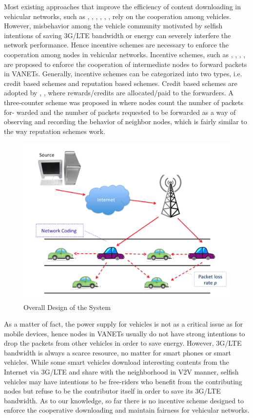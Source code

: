 \documentclass{acm_proc_article-sp}
\begin{document}
Most existing approaches that improve the efficiency of content downloading in vehicular networks, such as \cite{urban}, \cite{symbol}, \cite{cost}, \cite{opti}, \cite{ondemand}, \cite{datadissem}, rely on the cooperation among vehicles. However, misbehavior among the vehicle community motivated by selfish intentions of saving 3G/LTE bandwidth or energy can severely interfere the network performance. Hence incentive schemes are necessary to enforce the cooperation among nodes in vehicular networks. Incentive schemes, such as \cite{coalitional}, \cite{coop}, \cite{incentive}, \cite{uncoop}, are proposed to enforce the cooperation of intermediate nodes to forward packets in VANETs. Generally, incentive schemes can be categorized into two types, i.e. credit based schemes and reputation based schemes. Credit based schemes are adopted by \cite{coalitional}, \cite{incentive}, \cite{uncoop} where rewards/credits are allocated/paid to the forwarders. A three-counter scheme was proposed in \cite{coop} where nodes count the number of packets for- warded and the number of packets requested to be forwarded as a way of observing and recording the behavior of neighbor nodes, which is fairly similar to the way reputation schemes work. 

\begin{figure}
\centering
\includegraphics[scale=.30]{design.png} \caption{Overall Design of the System}
\label{design}
\end{figure}

As a matter of fact, the power supply for vehicles is not as a critical issue as for mobile devices, hence nodes in VANETs usually do not have strong intentions to drop the packets from other vehicles in order to save energy. However, 3G/LTE bandwidth is always a scarce resource, no matter for smart phones or smart vehicles. While some smart vehicles download interesting contents from the Internet via 3G/LTE and share with the neighborhood in V2V manner, selfish vehicles may have intentions to be free-riders who benefit from the contributing nodes but refuse to be the contributor itself in order to save its 3G/LTE bandwidth. As to our knowledge, so far there is no incentive scheme designed to enforce the cooperative downloading and maintain fairness for vehicular networks.
\end{document}
